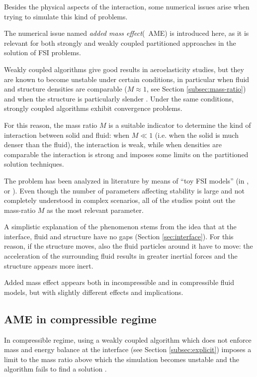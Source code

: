 Besides the physical aspects of the interaction, some numerical issues arise when trying to simulate this kind of problems.

The numerical issue named \textit{added mass effect}(~\ac{AME}) is introduced here, as it is relevant for both strongly and weakly coupled partitioned approaches in the solution of FSI problems. 

Weakly coupled algorithms give good results in aeroelasticity studies, but they are known to become unstable under certain conditions, in particular when fluid and structure densities are comparable ($M \approx 1$, see Section \ref{subsec:mass-ratio}) and when the structure is particularly slender \cite{causin2005added}.
Under the same conditions, strongly coupled algorithms exhibit convergence problems.

For this reason, the mass ratio $M$ is a suitable indicator to determine the kind of interaction between solid and fluid: when $M \ll 1$ (i.e. when the solid is much denser than the fluid), the interaction is weak, while when densities are comparable the interaction is strong and imposes some limits on the partitioned solution techniques.

The problem has been analyzed in literature by means of ``toy FSI models'' (in \cite{causin2005added}, \cite{degroote2008stability} or \cite{mehl2016parallel}). Even though the number of parameters affecting stability is large and not completely understood in complex scenarios, all of the studies point out the mass-ratio $M$ as the most relevant parameter.

A simplistic explanation of the phenomenon stems from the idea that at the interface, fluid and structure have no gaps (Section \ref{sec:interface}). For this reason, if the structure moves, also the fluid particles around it have to move: the acceleration of the surrounding fluid results in greater inertial forces and the structure appears more inert. 

Added mass effect appears both in incompressible and in compressible fluid models, but with slightly different effects and implications.


\subsection{AME in compressible regime}  

In compressible regime, using a weakly coupled algorithm which does not enforce mass and energy balance at the interface (see Section \ref{subsec:explicit}) imposes a limit to the mass ratio above which the simulation becomes unstable and the algorithm fails to find a solution \cite{bodnar2014fluid}.

